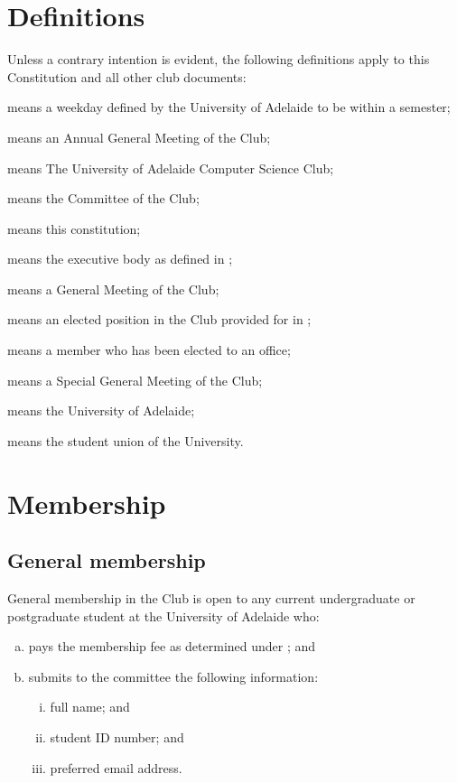 \documentclass{constitution}
\begin{document}
\section{Definitions}\label{definitions}
Unless a contrary intention is evident, the following definitions apply to this Constitution and all other club documents:
\begin{description}
    \item {} means a weekday defined by the University of Adelaide to be within a semester;
    \item {} means an Annual General Meeting of the Club;
    \item {} means The University of Adelaide Computer Science Club;
    \item {} means the Committee of the Club;
    \item {} means this constitution;
    \item {} means the executive body as defined in ;
    \item {} means a General Meeting of the Club;
    \item {} means an elected position in the Club provided for in ;
    \item {} means a member who has been elected to an office;
    \item {} means a Special General Meeting of the Club;
    \item {} means the University of Adelaide;
    \item {} means the student union of the University.
\end{description}


\section{Membership}\label{membershipClub}

\subsection{General membership}\label{generalMembership}
General membership in the Club is open to any current undergraduate or postgraduate student at the University of Adelaide who:
\begin{enumerate}[(a)]
    \item pays the membership fee as determined under ; and
    \item submits to the committee the following information:
          \begin{enumerate}[(i)]
              \item full name; and
              \item student ID number; and
              \item preferred email address.
          \end{enumerate}
\end{enumerate}
\end{document}
